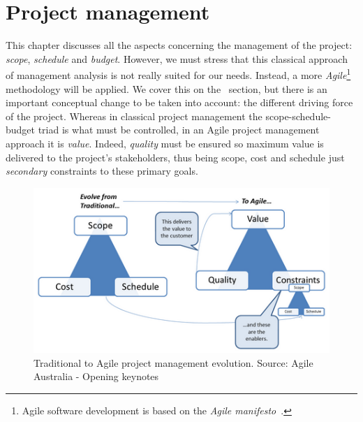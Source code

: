 \chapter{Project management} %
\label{Chapter5ProjectManagement} %


This chapter discusses all the aspects concerning the management of the project: \textit{scope}, \textit{schedule} and \textit{budget}. However, we must stress that this classical approach of management analysis is not really suited for our needs. Instead, a more \textit{Agile}\footnote{Agile software development is based on the \textit{Agile manifesto}~\cite{web:AgileManifesto}.} methodology will be applied. We cover this on the~ section, but there is an important conceptual change to be taken into account: the different driving force of the project. Whereas in classical project management the scope-schedule-budget triad is what must be controlled, in an Agile project management approach it is \textit{value}. Indeed, \textit{quality} must be ensured so maximum value is delivered to the project's stakeholders, thus being scope, cost and schedule just \textit{secondary} constraints to these primary goals.

\begin{figure}[ht]
	\centering
	\includegraphics[width=0.7\linewidth]{figures/agile-triangle.png}
	\caption[Transitioning to Agile methodologies.]{Traditional to Agile project management evolution. Source: Agile Australia - Opening keynotes~\citep{web:AgileTriangle}}
	\label{fig:agile-pm}
\end{figure}




